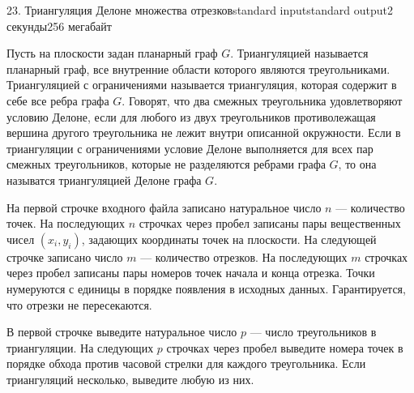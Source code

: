 \begin{problem}{23. Триангуляция Делоне множества отрезков}{standard input}{standard output}{2 секунды}{256 мегабайт}

Пусть на плоскости задан планарный граф $G$. Триангуляцией называется планарный граф, все внутренние области которого являются треугольниками. Триангуляцией с ограничениями называется триангуляция, которая содержит в себе все ребра графа $G$. Говорят, что два смежных треугольника удовлетворяют условию Делоне, если для любого из двух треугольников противолежащая вершина другого треугольника не лежит внутри описанной окружности. Если в триангуляции с ограничениями
условие Делоне выполняется для всех пар смежных треугольников, которые не разделяются ребрами графа $G$, то она называтся триангуляцией Делоне графа $G$.

\InputFile

На первой строчке входного файла записано натуральное число $n$ --- количество точек. На последующих $n$ строчках через пробел записаны пары вещественных чисел $(x_i, y_i)$, задающих координаты точек на плоскости. На следующей строчке записано число $m$ --- количество отрезков. На последующих $m$ строчках через пробел записаны пары номеров точек начала и конца отрезка. Точки нумеруются с единицы в порядке появления в исходных данных. Гарантируется, что отрезки не пересекаются.

\OutputFile

В первой строчке выведите натуральное число $p$ --- число треугольников в триангуляции. На следующих $p$ строчках через пробел выведите номера точек в порядке обхода против часовой стрелки для каждого треугольника. Если триангуляций несколько, выведите любую из них.

\Examples

\begin{example}%
%
\end{example}

\end{problem}
